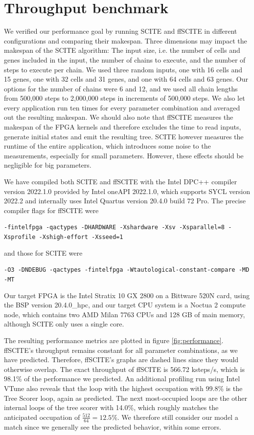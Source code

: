\section{Throughput benchmark}

We verified our performance goal by running \ac{SCITE} and \ac{ffSCITE} in different configurations and comparing their makespan. Three dimensions may impact the makespan of the \ac{SCITE} algorithm: The input size, i.e. the number of cells and genes included in the input, the number of chains to execute, and the number of steps to execute per chain. We used three random inputs, one with 16 cells and 15 genes, one with 32 cells and 31 genes, and one with 64 cells and 63 genes. Our options for the number of chains were 6 and 12, and we used all chain lengths from 500,000 steps to 2,000,000 steps in increments of 500,000 steps. We also let every application run ten times for every parameter combination and averaged out the resulting makespan. We should also note that \ac{ffSCITE} measures the makespan of the \ac{FPGA} kernels and therefore excludes the time to read inputs, generate initial states and emit the resulting tree. \ac{SCITE} however measures the runtime of the entire application, which introduces some noise to the measurements, especially for small parameters. However, these effects should be negligible for big parameters.

We have compiled both \ac{SCITE} and \ac{ffSCITE} with the Intel DPC++ compiler version 2022.1.0 provided by Intel oneAPI 2022.1.0, which supports SYCL version 2022.2 and internally uses Intel Quartus version 20.4.0 build 72 Pro. The precise compiler flags for \ac{ffSCITE} were
\begin{center}
    \texttt{-fintelfpga -qactypes -DHARDWARE -Xshardware -Xsv -Xsparallel=8 -Xsprofile -Xshigh-effort -Xsseed=1}
\end{center}
and those for \ac{SCITE} were 
\begin{center}
    \texttt{-O3 -DNDEBUG -qactypes -fintelfpga -Wtautological-constant-compare -MD -MT}
\end{center}
Our target \ac{FPGA} is the Intel Stratix 10 GX 2800 on a Bittware 520N card, using the \ac{BSP} version 20.4.0\_hpc, and our target \ac{CPU} system is a Noctua 2 compute node, which contains two AMD Milan 7763 \acp{CPU} and 128 GB of main memory, although \ac{SCITE} only uses a single core.

The resulting performance metrics are plotted in figure \ref{fig:performance}. \ac{ffSCITE}'s throughput remains constant for all parameter combinations, as we have predicted. Therefore, \ac{ffSCITE}'s graphs are dashed lines since they would otherwise overlap. The exact throughput of \ac{ffSCITE} is 566.72 ksteps/s, which is 98.1\% of the performance we predicted. An additional profiling run using Intel VTune also reveals that the loop with the highest occupation with 99.8\% is the Tree Scorer loop, again as predicted. The next most-occupied loops are the other internal loops of the tree scorer with 14.0\%, which roughly matches the anticipated occupation of $\frac{512}{64} = 12.5\%$. We therefore still consider our model a match since we generally see the predicted behavior, within some errors.

